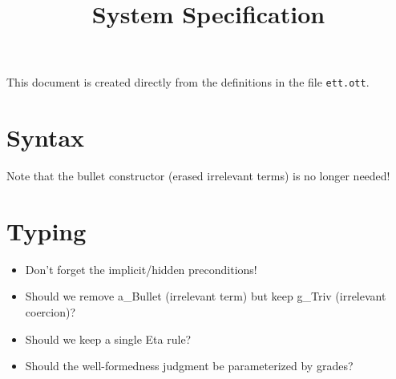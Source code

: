 \documentclass{article}
\title{System Specification}
\begin{document}
\maketitle

This document is created directly from the definitions in the file
{\texttt{ett.ott}}.

\section{Syntax}
\ottgrammartabular{
\otttm\ottinterrule
\ottcontext\ottafterlastrule
}
Note that the bullet constructor (erased irrelevant terms) is no longer needed!

\section{Typing}
\begin{itemize}
\item Don't forget the implicit/hidden preconditions!
\end{itemize}
\begin{itemize}
\item Should we remove a\_Bullet (irrelevant term) but keep g\_Triv (irrelevant coercion)?
\item Should we keep a single Eta rule?
\end{itemize}
\begin{itemize}
\item Should the well-formedness judgment be parameterized by grades?
\end{itemize}
\end{document}
